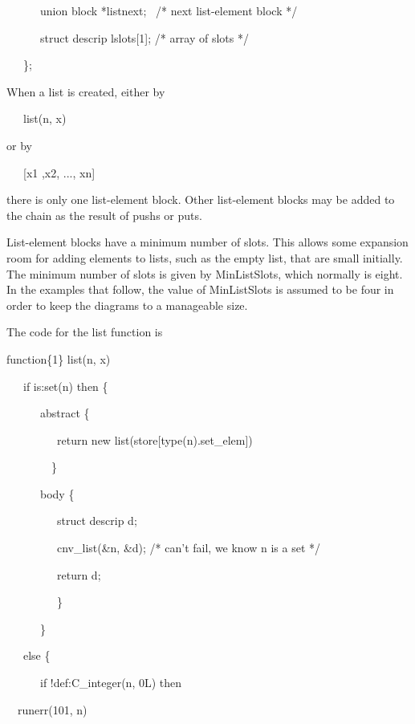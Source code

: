 {\ttfamily\mdseries
\ \ \ \ \ \ union block *listnext; \ /* next list-element block */}

{\ttfamily\mdseries
\ \ \ \ \ \ struct descrip lslots[1]; /* array of slots */}

{\ttfamily\mdseries
\ \ \ \};}


When a list is created, either by

{\ttfamily\mdseries
\ \ \ list(n, x)}

\noindent or by

{\ttfamily\mdseries
\ \ \ [x1 ,x2, ..., xn]}

\noindent there is only one list-element block. Other list-element
blocks may be added to the chain as the result of pushs or puts.

List-element blocks have a minimum number of slots. This allows some
expansion room for adding elements to lists, such as the empty list,
that are small initially. The minimum number of slots is given by
MinListSlots, which normally is eight. In the examples that follow,
the value of MinListSlots is assumed to be four in order to keep the
diagrams to a manageable size.

The code for the list function is

{\ttfamily\mdseries
function\{1\} list(n, x)}

{\ttfamily\mdseries
\ \ \ if is:set(n) then \{}

{\ttfamily\mdseries
\ \ \ \ \ \ abstract \{}

{\ttfamily\mdseries
\ \ \ \ \ \ \ \ \ return new list(store[type(n).set\_elem])}

{\ttfamily\mdseries
\ \ \ \ \ \ \ \  \}}

{\ttfamily\mdseries
\ \ \ \ \ \ body \{}

{\ttfamily\mdseries
\ \ \ \ \ \ \ \ \ struct descrip d;}

{\ttfamily\mdseries
\ \ \ \ \ \ \ \ \ cnv\_list(\&n, \&d); /* can't fail, we know n is a set */}

{\ttfamily\mdseries
\ \ \ \ \ \ \ \ \ return d;}

{\ttfamily\mdseries
\ \ \ \ \ \ \ \ \ \}}

{\ttfamily\mdseries
\ \ \ \ \ \ \}}

{\ttfamily\mdseries
\ \ \ else \{}

{\ttfamily\mdseries
\ \ \ \ \ \ if !def:C\_integer(n, 0L) then}

{\ttfamily\mdseries
\ \  runerr(101, n)}


\bigskip

